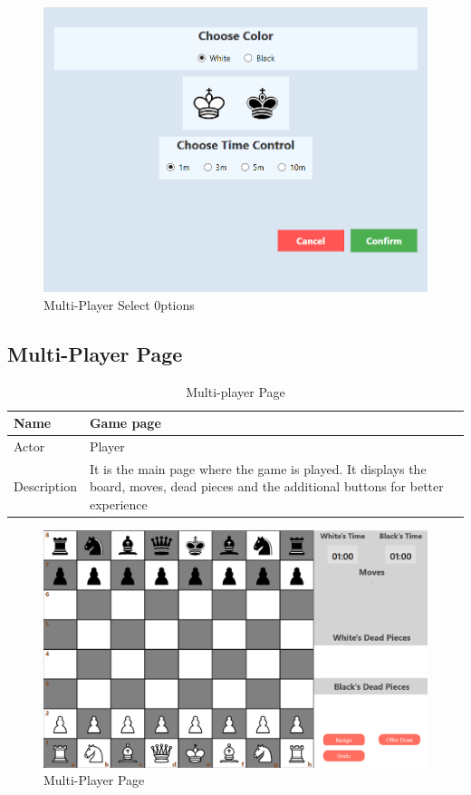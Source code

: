\documentclass[a4paper,12pt]{article}
\begin{document}
\begin{figure}[H]
    \centering
    \includegraphics[width=0.7\linewidth]{Images/Use Cases/multiplayerSelectOptions.png}
    \caption{Multi-Player Select 0ptions}
    \label{fig:multiplayerSelectOptions}
\end{figure}

\subsection{Multi-Player Page}

\begin{longtable}{|m{}|m{}|}
    \caption{Multi-player Page} \\
    \hline
    Name & Game page \\
    \hline
    Actor & Player \\
    \hline
    Description & It is the main page where the game is played. It displays the board, moves, dead pieces and the additional buttons for better experience \\ 
    \hline
\end{longtable}

\begin{figure}[H]
    \centering
    \includegraphics[width=0.8\linewidth]{Images/Use Cases/multiplayerPage.png}
    \caption{Multi-Player Page}
    \label{fig:multiPlayerPage}
\end{figure}
    
\end{document}
